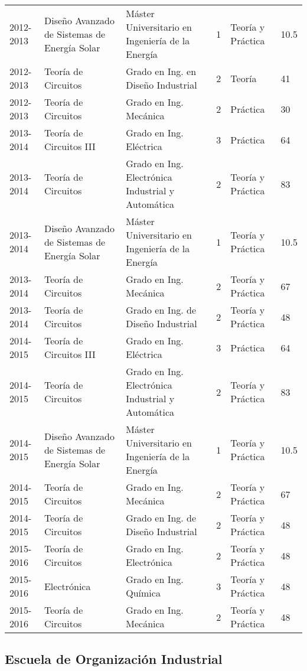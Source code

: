 \documentclass[article, a4paper]{memoir}
\begin{document}
\begin{center}
\begin{tabular}{p{18mm}p{45mm}p{40mm}p{10mm}p{15mm}p{10mm}}
2012-2013 & Diseño Avanzado de Sistemas de Energía Solar & Máster Universitario en Ingeniería de la Energía & 1 & Teoría y Práctica & 10.5\\
2012-2013 & Teoría de Circuitos & Grado en Ing. en Diseño Industrial & 2 & Teoría & 41\\
2012-2013 & Teoría de Circuitos & Grado en Ing. Mecánica & 2 & Práctica & 30\\
\hline
2013-2014 & Teoría de Circuitos III & Grado en Ing. Eléctrica & 3 & Práctica & 64\\
2013-2014 & Teoría de Circuitos & Grado en Ing. Electrónica Industrial y Automática & 2 & Teoría y Práctica & 83\\
2013-2014 & Diseño Avanzado de Sistemas de Energía Solar & Máster Universitario en Ingeniería de la Energía & 1 & Teoría y Práctica & 10.5\\
2013-2014 & Teoría de Circuitos & Grado en Ing. Mecánica & 2 & Teoría y Práctica & 67\\
2013-2014 & Teoría de Circuitos & Grado en Ing. de Diseño Industrial & 2 & Teoría y Práctica & 48\\
\hline
2014-2015 & Teoría de Circuitos III & Grado en Ing. Eléctrica & 3 & Práctica & 64\\
2014-2015 & Teoría de Circuitos & Grado en Ing. Electrónica Industrial y Automática & 2 & Teoría y Práctica & 83\\
2014-2015 & Diseño Avanzado de Sistemas de Energía Solar & Máster Universitario en Ingeniería de la Energía & 1 & Teoría y Práctica & 10.5\\
2014-2015 & Teoría de Circuitos & Grado en Ing. Mecánica & 2 & Teoría y Práctica & 67\\
2014-2015 & Teoría de Circuitos & Grado en Ing. de Diseño Industrial & 2 & Teoría y Práctica & 48\\
\hline
2015-2016 & Teoría de Circuitos & Grado en Ing. Electrónica & 2 & Teoría y Práctica & 48\\
2015-2016 & Electrónica & Grado en Ing. Química & 3 & Teoría y Práctica & 48\\
2015-2016 & Teoría de Circuitos & Grado en Ing. Mecánica & 2 & Teoría y Práctica & 48\\
\hline
\end{tabular}
\end{center}

\subsection{Escuela de Organización Industrial}
\label{sec:orgheadline12}
\end{document}
